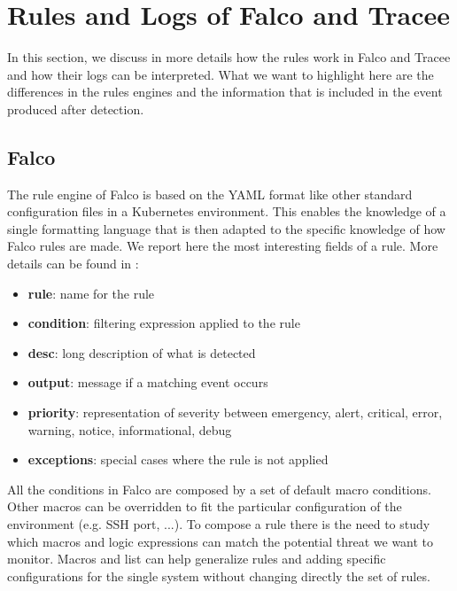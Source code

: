 \section{Rules and Logs of Falco and Tracee}
\label{sec:rules}

In this section, we discuss in more details how the rules work in Falco and Tracee and how their logs can be interpreted. What we want to highlight here are the differences in the rules engines and the information that is included in the event produced after detection.


\subsection{Falco}
The rule engine of Falco is based on the YAML format like other standard configuration files in a Kubernetes environment. This enables the knowledge of a single formatting language that is then adapted to the specific knowledge of how Falco rules are made. We report here the most interesting fields of a rule. More details can be found in \cite{falcoFields}:
\begin{itemize}
    \item \textbf{rule}: name for the rule
    \item \textbf{condition}: filtering expression applied to the rule
    \item \textbf{desc}: long description of what is detected
    \item \textbf{output}: message if a matching event occurs
    \item \textbf{priority}: representation of severity between emergency, alert, critical, error, warning, notice, informational, debug
    \item \textbf{exceptions}: special cases where the rule is not applied
\end{itemize}
All the conditions in Falco are composed by a set of default macro conditions\cite{falcoMacros}. Other macros can be overridden to fit the particular configuration of the environment (e.g. SSH port, ...). To compose a rule there is the need to study which macros and logic expressions can match the potential threat we want to monitor. Macros and list can help generalize rules and adding specific configurations for the single system without changing directly the set of rules.

